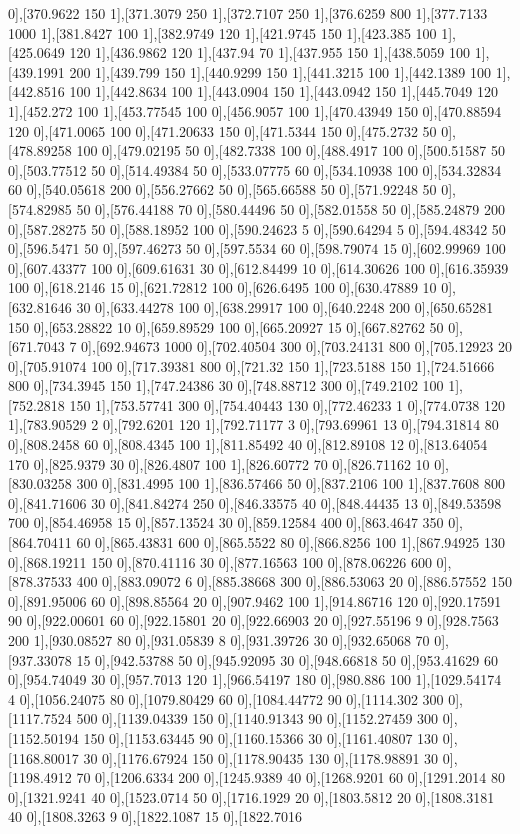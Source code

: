 {0],[370.9622 150 1],[371.3079 250 1],[372.7107 250 1],[376.6259 800 1],[377.7133 1000 1],[381.8427 100 1],[382.9749 120 1],[421.9745 150 1],[423.385 100 1],[425.0649 120 1],[436.9862 120 1],[437.94 70 1],[437.955 150 1],[438.5059 100 1],[439.1991 200 1],[439.799 150 1],[440.9299 150 1],[441.3215 100 1],[442.1389 100 1],[442.8516 100 1],[442.8634 100 1],[443.0904 150 1],[443.0942 150 1],[445.7049 120 1],[452.272 100 1],[453.77545 100 0],[456.9057 100 1],[470.43949 150 0],[470.88594 120 0],[471.0065 100 0],[471.20633 150 0],[471.5344 150 0],[475.2732 50 0],[478.89258 100 0],[479.02195 50 0],[482.7338 100 0],[488.4917 100 0],[500.51587 50 0],[503.77512 50 0],[514.49384 50 0],[533.07775 60 0],[534.10938 100 0],[534.32834 60 0],[540.05618 200 0],[556.27662 50 0],[565.66588 50 0],[571.92248 50 0],[574.82985 50 0],[576.44188 70 0],[580.44496 50 0],[582.01558 50 0],[585.24879 200 0],[587.28275 50 0],[588.18952 100 0],[590.24623 5 0],[590.64294 5 0],[594.48342 50 0],[596.5471 50 0],[597.46273 50 0],[597.5534 60 0],[598.79074 15 0],[602.99969 100 0],[607.43377 100 0],[609.61631 30 0],[612.84499 10 0],[614.30626 100 0],[616.35939 100 0],[618.2146 15 0],[621.72812 100 0],[626.6495 100 0],[630.47889 10 0],[632.81646 30 0],[633.44278 100 0],[638.29917 100 0],[640.2248 200 0],[650.65281 150 0],[653.28822 10 0],[659.89529 100 0],[665.20927 15 0],[667.82762 50 0],[671.7043 7 0],[692.94673 1000 0],[702.40504 300 0],[703.24131 800 0],[705.12923 20 0],[705.91074 100 0],[717.39381 800 0],[721.32 150 1],[723.5188 150 1],[724.51666 800 0],[734.3945 150 1],[747.24386 30 0],[748.88712 300 0],[749.2102 100 1],[752.2818 150 1],[753.57741 300 0],[754.40443 130 0],[772.46233 1 0],[774.0738 120 1],[783.90529 2 0],[792.6201 120 1],[792.71177 3 0],[793.69961 13 0],[794.31814 80 0],[808.2458 60 0],[808.4345 100 1],[811.85492 40 0],[812.89108 12 0],[813.64054 170 0],[825.9379 30 0],[826.4807 100 1],[826.60772 70 0],[826.71162 10 0],[830.03258 300 0],[831.4995 100 1],[836.57466 50 0],[837.2106 100 1],[837.7608 800 0],[841.71606 30 0],[841.84274 250 0],[846.33575 40 0],[848.44435 13 0],[849.53598 700 0],[854.46958 15 0],[857.13524 30 0],[859.12584 400 0],[863.4647 350 0],[864.70411 60 0],[865.43831 600 0],[865.5522 80 0],[866.8256 100 1],[867.94925 130 0],[868.19211 150 0],[870.41116 30 0],[877.16563 100 0],[878.06226 600 0],[878.37533 400 0],[883.09072 6 0],[885.38668 300 0],[886.53063 20 0],[886.57552 150 0],[891.95006 60 0],[898.85564 20 0],[907.9462 100 1],[914.86716 120 0],[920.17591 90 0],[922.00601 60 0],[922.15801 20 0],[922.66903 20 0],[927.55196 9 0],[928.7563 200 1],[930.08527 80 0],[931.05839 8 0],[931.39726 30 0],[932.65068 70 0],[937.33078 15 0],[942.53788 50 0],[945.92095 30 0],[948.66818 50 0],[953.41629 60 0],[954.74049 30 0],[957.7013 120 1],[966.54197 180 0],[980.886 100 1],[1029.54174 4 0],[1056.24075 80 0],[1079.80429 60 0],[1084.44772 90 0],[1114.302 300 0],[1117.7524 500 0],[1139.04339 150 0],[1140.91343 90 0],[1152.27459 300 0],[1152.50194 150 0],[1153.63445 90 0],[1160.15366 30 0],[1161.40807 130 0],[1168.80017 30 0],[1176.67924 150 0],[1178.90435 130 0],[1178.98891 30 0],[1198.4912 70 0],[1206.6334 200 0],[1245.9389 40 0],[1268.9201 60 0],[1291.2014 80 0],[1321.9241 40 0],[1523.0714 50 0],[1716.1929 20 0],[1803.5812 20 0],[1808.3181 40 0],[1808.3263 9 0],[1822.1087 15 0],[1822.7016 }
